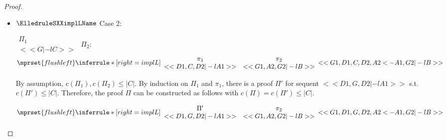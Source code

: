 \begin{proof}
\begin{enumerate}
\begin{itemize}
  \item $\ElledruleSXXimplLName$ Case 2:
      \begin{center}
        \scriptsize
        \begin{math}
          \begin{array}{c}
            \Pi_1 \\
            {<<G |-l C>>}
          \end{array}
        \end{math}
        \qquad\qquad
        $\Pi_2$:
        \begin{math}
          $$\mprset{flushleft}
          \inferrule* [right={\tiny implL}] {
            {
              \begin{array}{cc}
                \pi_1 & \pi_2 \\
                {<<D1, C, D2 |-l A1>>} & {<<G1, A2, G2 |-l B>>}
              \end{array}
            }
          }{<<G1, D1, C, D2, A2 <- A1, G2 |-l B>>}
        \end{math}
      \end{center}
      By assumption, $c(\Pi_1),c(\Pi_2)\leq |C|$. By induction on $\Pi_1$ and $\pi_1$, there is
      a proof $\Pi'$ for sequent $<<D1, G, D2 |-l A1>>$ s.t. $c(\Pi') \leq |C|$. Therefore, the
      proof $\Pi$ can be constructed as follows with $c(\Pi) = c(\Pi') \leq |C|$.
      \begin{center}
        \scriptsize
        \begin{math}
          $$\mprset{flushleft}
          \inferrule* [right={\tiny implL}] {
            {
              \begin{array}{cc}
                \Pi' & \pi_2 \\
                {<<D1, G, D2 |-l A1>>} & {<<G1, A2, G2 |-l B>>}
              \end{array}
            }
          }{<<G1, D1, G, D2, A2 <- A1, G2 |-l B>>}
        \end{math}
      \end{center}


\end{itemize}
\end{enumerate}
\end{proof}

